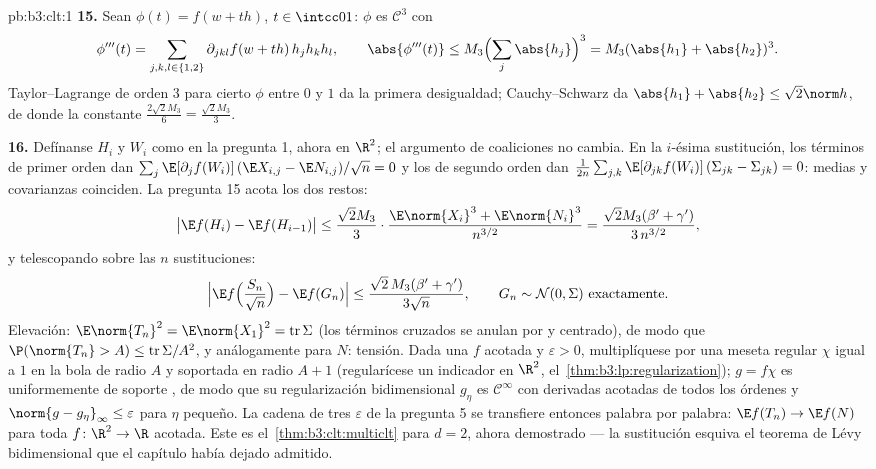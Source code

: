 \begin{solution}{pb:b3:clt:1}
\textbf{15.} Sean $\phi(t) = f(w + th)$, $t \in \intcc01$: $\phi$ es
$\mathcal C^3$ con
\[
\phi'''(t) = \sum_{j,k,l\in\{1,2\}}\partial_{jkl}f(w +
th)\,h_jh_kh_l, \qquad \abs{\phi'''(t)} \leq
M_3\Bigl(\sum_j\abs{h_j}\Bigr)^3 = M_3(\abs{h_1} +
\abs{h_2})^3 .
\]
Taylor--Lagrange de orden $3$ para cierto $\phi$ entre $0$ y $1$ da la
primera desigualdad; Cauchy--Schwarz da
$\abs{h_1} + \abs{h_2} \leq \sqrt2\norm h$, de donde la constante
$\frac{2\sqrt2M_3}6 = \frac{\sqrt2M_3}3$.

\textbf{16.} Defínanse $H_i$ y $W_i$ como en la pregunta 1, ahora en
$\R^2$; el argumento de coaliciones no cambia. En la $i$-ésima
sustitución, los términos de primer orden dan
$\sum_j\E[\partial_jf(W_i)]\,(\E X_{i,j} - \E N_{i,j})/
\sqrt n = 0$ y los de segundo orden dan
$\frac1{2n}\sum_{j,k}\E[\partial_{jk}f(W_i)]\,(\Sigma_{jk}
- \Sigma_{jk}) = 0$: medias y covarianzas coinciden. La pregunta 15
acota los dos restos:
\[
\bigl|\E f(H_i) - \E f(H_{i-1})\bigr| \leq
\frac{\sqrt2M_3}3\cdot\frac{\E\norm{X_i}^3 +
\E\norm{N_i}^3}{n^{3/2}}
= \frac{\sqrt2M_3(\beta' + \gamma')}{3\,n^{3/2}},
\]
y telescopando sobre las $n$ sustituciones:
\[
\Bigl|\E f\Bigl(\frac{S_n}{\sqrt n}\Bigr) - \E
f(G_n)\Bigr| \leq \frac{\sqrt2\,M_3(\beta' +
\gamma')}{3\sqrt n},
\qquad G_n \sim \mathcal N(0, \Sigma)\ \text{exactamente} .
\]
Elevación: $\E\norm{T_n}^2 = \E\norm{X_1}^2 =
\operatorname{tr}\Sigma$ (los términos cruzados se anulan por
 y centrado), de
modo que $\P(\norm{T_n} > A) \leq
\operatorname{tr}\Sigma/A^2$, y análogamente para $N$: tensión. Dada una
$f$  acotada y $\varepsilon
> 0$, multiplíquese por una meseta regular $\chi$ igual a $1$ en la bola
de radio $A$ y soportada en radio $A + 1$ (regularícese un indicador en
$\R^2$, el~\cref{thm:b3:lp:regularization}); $g = f\chi$ es
uniformemente  de soporte
, de modo que su
regularización bidimensional $g_\eta$ es $\mathcal C^\infty$ con
derivadas acotadas de todos los órdenes y $\norm{g - g_\eta}_\infty
\leq \varepsilon$ para $\eta$ pequeño. La cadena de tres $\varepsilon$
de la pregunta 5 se transfiere entonces palabra por palabra: $\E f(T_n)
\to \E f(N)$ para toda $f \colon \R^2
\to \R$  acotada. Este es
el~\cref{thm:b3:clt:multiclt} para $d = 2$, ahora demostrado --- la
sustitución esquiva el teorema de Lévy bidimensional que el capítulo
había dejado admitido.


\end{solution}
